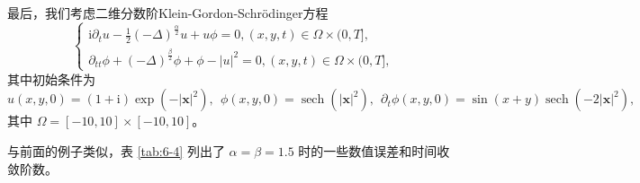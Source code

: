 \begin{example}\label{ex:4}
	最后，我们考虑二维分数阶Klein-Gordon-Schr{\"o}dinger方程
	\begin{equation}
	\begin{cases}
	\mathrm{i} \partial_t u-\frac{1}{2}(-\Delta)^{\frac{\alpha}{2}} u+u \phi=0,(x, y, t) \in \Omega \times(0, T],\\
	\partial_{t t} \phi+(-\Delta)^{\frac{\beta}{2}} \phi+\phi-|u|^2=0, (x, y, t) \in \Omega \times(0, T],
	\end{cases}
	\end{equation}
	其中初始条件为
	\begin{equation}
	u(x, y, 0)=(1+\mathrm{i}) \exp \left(-|\boldsymbol{x}|^2\right),~~\phi(x, y, 0)=\operatorname{sech}\left(|\boldsymbol{x}|^2\right),~~ \partial_t \phi(x, y, 0)=\sin (x+y) \operatorname{sech}\left(-2|\boldsymbol{x}|^2\right),
	\end{equation}
	其中 $\Omega=[-10,10] \times[-10,10]$。
	\end{example}
	
	与前面的例子类似，表 \ref{tab:6-4} 列出了 $\alpha=\beta=1.5$ 时的一些数值误差和时间收敛阶数。

